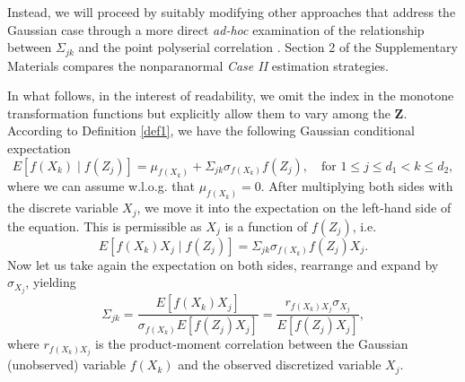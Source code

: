 Instead, we will proceed by suitably modifying other approaches that address the Gaussian case through a more direct \textit{ad-hoc} examination of the relationship between $\Sigma_{jk}$ and the point polyserial correlation \citep{Bedrick92, Bedrick96}.
Section 2 of the Supplementary Materials compares the nonparanormal \textit{Case II} estimation strategies.

In what follows, in the interest of readability, we omit the index in the monotone transformation functions but explicitly allow them to vary among the $\mathbf{Z}$. According to Definition \ref{def1}, we have the following Gaussian conditional expectation
\begin{equation}
    E[f(X_k) \mid f(Z_j)] = \mu_{f(X_k)} + \Sigma_{jk}\sigma_{f(X_k)} f(Z_j), \quad \text{for } 1 \leq j \leq d_1 < k \leq d_2,
\end{equation}
where we can assume w.l.o.g. that $\mu_{f(X_k)} = 0$. After multiplying both sides with the discrete variable $X_j$, we move it into the expectation on the left-hand side of the equation. This is permissible as $X_j$ is a function of $f(Z_j)$, i.e.
\begin{equation*}
    E[f(X_k)X_j \mid f(Z_j)] = \Sigma_{jk}\sigma_{f(X_k)} f(Z_j)X_j.
\end{equation*}
Now let us take again the expectation on both sides, rearrange and expand by $\sigma_{X_j}$, yielding
\begin{equation}\label{population_polyserial_nonpara}
    \Sigma_{jk} = \frac{E[f(X_k)X_j]}{\sigma_{f(X_k)} E[f(Z_j)X_j]} = \frac{r_{f(X_k)X_j}\sigma_{X_j}}{E[f(Z_j)X_j]},
\end{equation}
where $r_{f(X_k)X_j}$ is the product-moment correlation between the Gaussian (unobserved) variable $f(X_k)$ and the observed discretized variable $X_j$.

